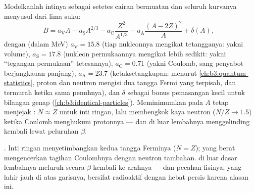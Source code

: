 \begin{proposition}\label{prop:b3:nuclear-physics:semf}
Modelkanlah intinya sebagai setetes cairan bermuatan dan seluruh kurvanya
menyusul dari lima suku:
\[
B = a_{\text{V}}A - a_{\text{S}}A^{2/3}
- a_{\text{C}}\frac{Z^2}{A^{1/3}}
- a_{\text{A}}\frac{(A - 2Z)^2}{A} + \delta(A) ,
\]
dengan (dalam \unit{MeV}) $a_{\text{V}} = 15.8$ (tiap nukleonnya mengikat
tetangganya: yakni volume), $a_{\text{S}} = 17.8$ (nukleon permukaannya mengikat
lebih sedikit: yakni ``tegangan permukaan'' tetesannya), $a_{\text{C}} = 0.71$
(yakni Coulomb, sang penyabot berjangkauan panjang), $a_{\text{A}} = 23.7$
(ketaksetangkupan: menurut \cref{ch:b3:quantum-statistics}, proton dan
neutron mengisi dua tangga Fermi yang terpisah, dan termurah ketika sama
penuhnya), dan $\delta$ sebagai bonus pemasangan kecil untuk bilangan genap
(\cref{ch:b3:identical-particles}). Meminimumkan pada $A$ tetap menjejak
\emph{}: $N \approx Z$ untuk inti ringan, lalu
membengkok kaya neutron ($N/Z \to 1.5$) ketika Coulomb menghukum protonnya
--- dan  di luar lembahnya menggelinding kembali lewat peluruhan $\beta$.
\end{proposition}
\admitted

\begin{omfigure}

{\small {}. Inti ringan menyetimbangkan kedua
tangga Ferminya ($N = Z$); yang berat mengencerkan tagihan Coulombnya dengan
neutron tambahan.  di luar dasar lembahnya meluruh secara $\beta$
kembali ke arahnya --- dan pecahan fisinya, yang lahir jauh di atas garisnya,
bersifat radioaktif dengan hebat persis karena alasan ini.}
\end{omfigure}

